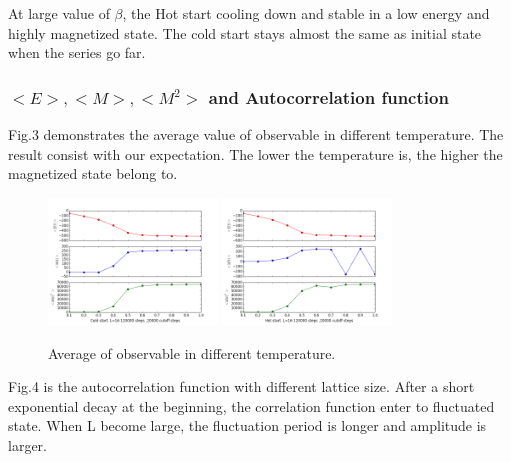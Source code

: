 \documentclass[12pt]{article}
\begin{document}
At large value of $\beta$, the Hot start cooling down and stable in a low energy and highly magnetized state. The cold start stays almost the same as initial state when the series go far.

\subsubsection{$<E>,<M>,<M^2>$ and Autocorrelation function}
Fig.3 demonstrates the average value of observable in different temperature. The result consist with our expectation. The lower the temperature is, the higher the magnetized state belong to. 

\begin{figure}[h!]
	\begin{center}
		\includegraphics[width=0.4\textwidth]{average_plot_L_16_Cold.png}
		\includegraphics[width=0.4\textwidth]{average_plot_L_16_Hot.png}
		\caption{Average of observable in different temperature.}
		\label{fig3}
	\end{center}
\end{figure}

Fig.4 is the autocorrelation function with different lattice size. After a short exponential decay at the beginning, the correlation function enter to fluctuated state. When L become large, the fluctuation period is longer and amplitude is larger.
\end{document}
